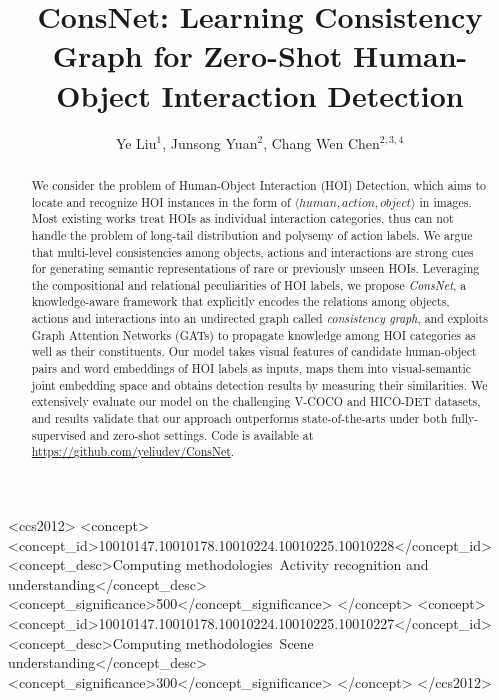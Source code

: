 \documentclass[sigconf,screen]{acmart}
\begin{document}
\title{ConsNet: Learning Consistency Graph for Zero-Shot Human-Object Interaction Detection}

\author{Ye Liu$^{1}$, Junsong Yuan$^{2}$, Chang Wen Chen$^{2,3,4}$}

\renewcommand{\authors}{Ye Liu, Junsong Yuan, and Chang Wen Chen}
\renewcommand{\shortauthors}{\authors}

\begin{abstract}

We consider the problem of Human-Object Interaction (HOI) Detection, which aims to locate and recognize HOI instances in the form of $\langle human, action, object \rangle$ in images. Most existing works treat HOIs as individual interaction categories, thus can not handle the problem of long-tail distribution and polysemy of action labels. We argue that multi-level consistencies among objects, actions and interactions are strong cues for generating semantic representations of rare or previously unseen HOIs. Leveraging the compositional and relational peculiarities of HOI labels, we propose \textit{ConsNet}, a knowledge-aware framework that explicitly encodes the relations among objects, actions and interactions into an undirected graph called \textit{consistency graph}, and exploits Graph Attention Networks (GATs) to propagate knowledge among HOI categories as well as their constituents. Our model takes visual features of candidate human-object pairs and word embeddings of HOI labels as inputs, maps them into visual-semantic joint embedding space and obtains detection results by measuring their similarities. We extensively evaluate our model on the challenging V-COCO and HICO-DET datasets, and results validate that our approach outperforms state-of-the-arts under both fully-supervised and zero-shot settings. Code is available at \href{https://github.com/yeliudev/ConsNet}{https://github.com/yeliudev/ConsNet}.

\end{abstract}

\begin{CCSXML}
<ccs2012>
<concept>
<concept_id>10010147.10010178.10010224.10010225.10010228</concept_id>
<concept_desc>Computing methodologies~Activity recognition and understanding</concept_desc>
<concept_significance>500</concept_significance>
</concept>
<concept>
<concept_id>10010147.10010178.10010224.10010225.10010227</concept_id>
<concept_desc>Computing methodologies~Scene understanding</concept_desc>
<concept_significance>300</concept_significance>
</concept>
</ccs2012>
\end{CCSXML}
\end{document}
